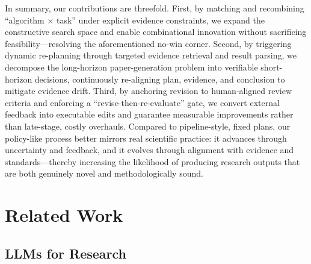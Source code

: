 \documentclass[manuscript,review,anonymous]{acmart}
\begin{document}
In summary, our contributions are threefold. First, by matching and recombining “algorithm × task” under explicit evidence constraints, we expand the constructive search space and enable combinational innovation without sacrificing feasibility—resolving the aforementioned no-win corner. Second, by triggering dynamic re-planning through targeted evidence retrieval and result parsing, we decompose the long-horizon paper-generation problem into verifiable short-horizon decisions, continuously re-aligning plan, evidence, and conclusion to mitigate evidence drift. Third, by anchoring revision to human-aligned review criteria and enforcing a “revise-then-re-evaluate” gate, we convert external feedback into executable edits and guarantee measurable improvements rather than late-stage, costly overhauls. Compared to pipeline-style, fixed plans, our policy-like process better mirrors real scientific practice: it advances through uncertainty and feedback, and it evolves through alignment with evidence and standards—thereby increasing the likelihood of producing research outputs that are both genuinely novel and methodologically sound.

\section{Related Work}

\subsection{LLMs for Research}
\end{document}
